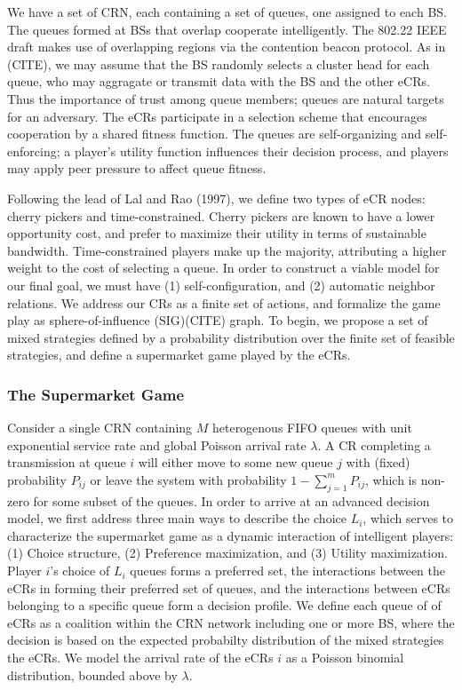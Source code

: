 \documentclass[10pt]{article}
\theoremstyle{definition}
\begin{document}
We have a set of CRN, each containing a set of queues, one assigned to each BS. 
The queues formed at BSs that overlap cooperate intelligently. 
The 802.22 IEEE draft makes use of overlapping regions via the
contention beacon protocol. As in (CITE), we may assume that the BS randomly
selects a cluster head for each queue, who may aggragate or transmit data with
the BS and the other eCRs. Thus the importance of trust among queue members;
queues are natural targets for an adversary. 
The eCRs participate in a selection scheme that
encourages cooperation by a shared fitness function. The queues
are self-organizing and
self-enforcing; a player's utility function influences their decision process,
and players may apply peer pressure to affect queue fitness.

Following the lead of Lal
and Rao (1997), we define two types of eCR nodes: cherry pickers and
time-constrained. Cherry pickers are known to have a lower opportunity cost, and
prefer to maximize their utility in terms of sustainable bandwidth. 
Time-constrained players make up the majority, attributing a higher weight to
the cost of selecting a queue. 
In order to construct a viable model for our 
final goal, we must have (1) self-configuration, and (2) automatic neighbor relations. 
We address our CRs as a finite set of
actions, and formalize the game play as sphere-of-influence (SIG)(CITE) graph.
To begin, we propose a set of mixed
strategies defined by a probability distribution over
the finite set of feasible strategies, and define a 
supermarket game played by the eCRs.

\subsubsection{The Supermarket Game}

Consider a single CRN containing $M$ heterogenous FIFO queues with unit exponential service rate and global
Poisson arrival rate $\lambda$. A CR completing a transmission at queue $i$ will either 
move to some new queue $j$ with (fixed) probability $P_{ij}$ or leave the system 
with probability $\displaystyle 1-\sum _{j=1}^{m}P_{ij}$, which is non-zero for some subset of the queues. 
In order to arrive at an advanced decision model, we first address three main ways to describe the choice $L_i$, which serves to characterize the
supermarket game as a dynamic interaction of intelligent players: (1) Choice structure,
(2) Preference maximization, and (3) Utility maximization.
Player $i$'s choice of $L_i$ queues forms a preferred set, the interactions between the eCRs in forming their
preferred set of queues, and the interactions between eCRs belonging to a specific
queue form a decision profile. We define each queue of of eCRs as a coalition
within the CRN network including one or more BS, where the decision is based on
the expected probabilty distribution of the mixed strategies the eCRs.
We model the arrival rate of the eCRs $i$ as a 
Poisson binomial distribution, bounded above by $\lambda$.
\end{document}
